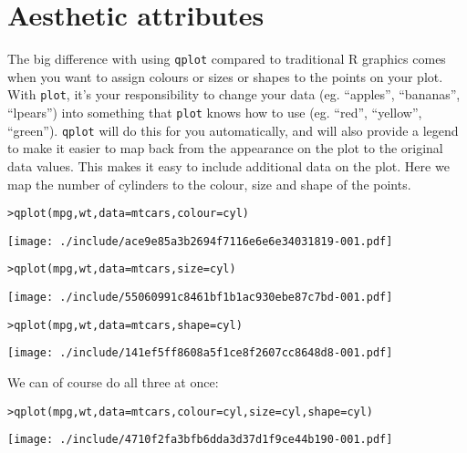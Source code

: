\section{Aesthetic attributes}\label{sec:aesthetic_attributes}

The big difference with using {\tt qplot} compared to traditional R graphics comes when you want to assign colours or sizes or shapes to the points on your plot.  With {\tt plot}, it's your responsibility to change your data (eg. ``apples'', ``bananas'', ``lpears'') into something that {\tt plot} knows how to use (eg. ``red'', ``yellow'', ``green'').  {\tt qplot} will do this for you automatically, and will also provide a legend to make it easier to map back from the appearance on the plot to the original data values.  This makes it easy to include additional data on the plot.  Here we map the number of cylinders to the colour, size and shape of the points.

\begin{alltt}
> qplot(mpg, wt, data = mtcars, colour = cyl)
\end{alltt}
\texttt{[image: ./include/ace9e85a3b2694f7116e6e6e34031819-001.pdf]}
\begin{alltt}

> qplot(mpg, wt, data = mtcars, size = cyl)
\end{alltt}
\texttt{[image: ./include/55060991c8461bf1b1ac930ebe87c7bd-001.pdf]}
\begin{alltt}

> qplot(mpg, wt, data = mtcars, shape = cyl)
\end{alltt}
\texttt{[image: ./include/141ef5ff8608a5f1ce8f2607cc8648d8-001.pdf]}
\begin{alltt}

\end{alltt}%

We can of course do all three at once:

\begin{alltt}
> qplot(mpg, wt, data = mtcars, colour = cyl, size = cyl, shape = cyl)
\end{alltt}
\texttt{[image: ./include/4710f2fa3bfb6dda3d37d1f9ce44b190-001.pdf]}
\begin{alltt}

\end{alltt}%

